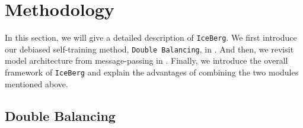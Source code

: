 \section{Methodology}

In this section, we will give a detailed description of \texttt{IceBerg}. We first introduce our debiased self-training method, \texttt{Double Balancing}, in . And then, we revisit model architecture from message-passing in . Finally, we introduce the overall framework of \texttt{IceBerg} and explain the advantages of combining the two modules mentioned above.


\subsection{Double Balancing}
\label{sec:double}

